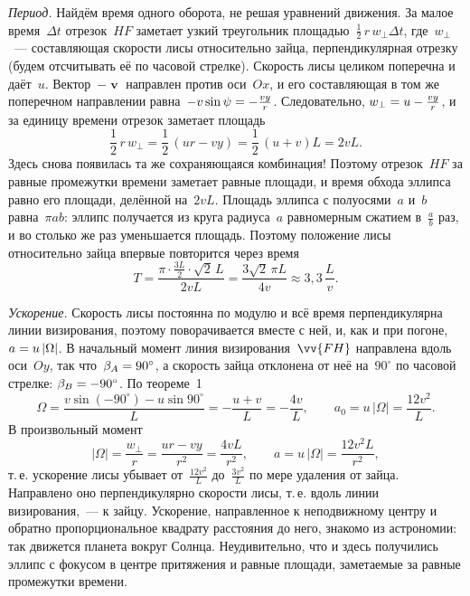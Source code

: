 \documentclass[../main.tex]{subfiles}
\begin{document}
\begin{example}
\noindent\textit{Период.} Найдём время одного оборота, не решая уравнений движения.
За малое время~$\Delta t$ отрезок~$HF$ заметает узкий треугольник площадью~$\frac{1}{2}\,r\,w_\perp\Delta t$, где~$w_\perp$~--- составляющая скорости лисы
относительно зайца, перпендикулярная отрезку (будем отсчитывать её по часовой
стрелке). Скорость лисы целиком поперечна и даёт~$u$. Вектор~$-\mbfv$ направлен
против оси~$Ox$, и его составляющая в том же поперечном направлении равна~$-v\sin\psi \hm= -\frac{vy}{r}$. Следовательно, $w_\perp \hm= u - \frac{vy}{r}$, и за
единицу времени отрезок заметает площадь
\[
\frac{1}{2}\,r\,w_\perp = \frac{1}{2}\,(ur - vy) = \frac{1}{2}\,(u + v)L = 2vL.
\]
Здесь снова появилась та же сохраняющаяся комбинация! Поэтому отрезок~$HF$ за равные
промежутки времени заметает равные площади, и время обхода эллипса равно его
площади, делённой на~$2vL$. Площадь эллипса с полуосями~$a$ и~$b$ равна~$\pi ab$:
эллипс получается из круга радиуса~$a$ равномерным сжатием в~$\frac{a}{b}$ раз, и во
столько же раз уменьшается площадь. Поэтому положение лисы относительно зайца
впервые повторится через время
\[
T = \frac{\pi\cdot\frac{3L}{2}\cdot\sqrt{2}\,L}{2vL} = \frac{3\sqrt{2}\,\pi L}{4v}
\approx 3{,}3\,\frac{L}{v}.
\]

\noindent\textit{Ускорение.} Скорость лисы постоянна по модулю и всё время
перпендикулярна линии визирования, поэтому поворачивается вместе с ней, и, как и при
погоне, $a \hm= u\,|\Omega|$. В начальный момент линия визирования~$\vv{FH}$
направлена вдоль оси~$Oy$, так что~$\beta_A \hm= 90^\circ$, а скорость зайца отклонена от
неё на~$90^\circ$ по часовой стрелке: $\beta_B \hm= -90^\circ$. По теореме~1
\[
\Omega = \frac{v\sin(-90^\circ) - u\sin 90^\circ}{L} = -\frac{u + v}{L} = -\frac{4v}{L},
\qquad
a_0 = u\,|\Omega| = \frac{12v^2}{L}.
\]
В произвольный момент
\[
|\Omega| = \frac{w_\perp}{r} = \frac{ur - vy}{r^2} = \frac{4vL}{r^2},
\qquad
a = u\,|\Omega| = \frac{12v^2L}{r^2},
\]
т.\,е. ускорение лисы убывает от~$\frac{12v^2}{L}$ до~$\frac{3v^2}{L}$ по мере удаления от
зайца. Направлено оно
перпендикулярно скорости лисы, т.\,е. вдоль линии визирования,~--- к зайцу. Ускорение,
направленное к неподвижному центру и обратно пропорциональное квадрату расстояния до
него, знакомо из астрономии: так движется планета вокруг Солнца. Неудивительно, что и
здесь получились эллипс с фокусом в центре притяжения и равные площади, заметаемые за
равные промежутки времени.
\end{example}

\end{document}
